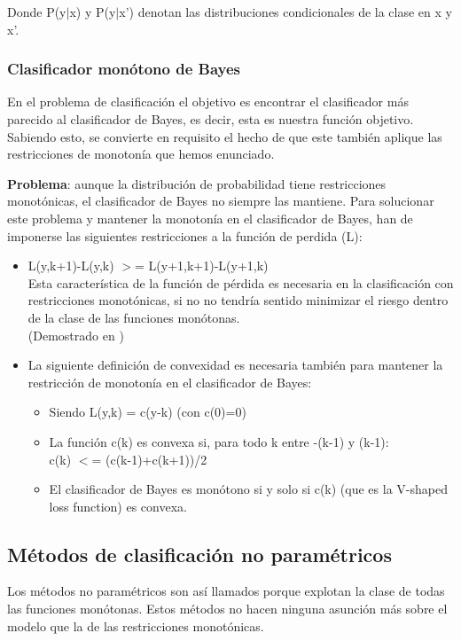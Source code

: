 Donde P(y$|$x) y P(y$|$x') denotan las distribuciones condicionales de la clase en x y x'. 

\subsubsection{Clasificador monótono de Bayes}

En el problema de clasificación el objetivo es encontrar el clasificador más
parecido al clasificador de Bayes, es decir, esta es nuestra función objetivo.
Sabiendo esto, se convierte en requisito el hecho de que este también aplique
las restricciones de monotonía que hemos enunciado. 

\textbf{Problema}: aunque la
distribución de probabilidad tiene restricciones monotónicas, el clasificador
de Bayes no siempre las mantiene.
Para solucionar este problema y mantener la monotonía en el clasificador de 
Bayes, han de imponerse las siguientes restricciones a la función de perdida
(L):

\begin{itemize}
	\item L(y,k+1)-L(y,k) $>$= L(y+1,k+1)-L(y+1,k) \\
	Esta característica de la función de pérdida es necesaria
	en la clasificación con restricciones monotónicas, si no no
	tendría sentido minimizar el riesgo dentro de la clase de las funciones monótonas.\\
	(Demostrado en \cite{ref2})
	\item La siguiente definición de convexidad es necesaria también para
	mantener la restricción de monotonía en el clasificador de Bayes:
		\begin{itemize}
			\item Siendo L(y,k) = c(y-k) (con c(0)=0)
			\item La función c(k) es convexa si, para todo k entre -(k-1) y (k-1):\\
			c(k) $<$= (c(k-1)+c(k+1))/2
			\item El clasificador de Bayes es monótono si y solo si c(k) (que es
			la V-shaped loss function) es convexa.
		\end{itemize}
\end{itemize}


\subsection{Métodos de clasificación no paramétricos}

Los métodos no paramétricos son así llamados porque explotan la clase de todas las
funciones monótonas. Estos métodos no hacen ninguna asunción más sobre el modelo que la de 
las restricciones monotónicas.

